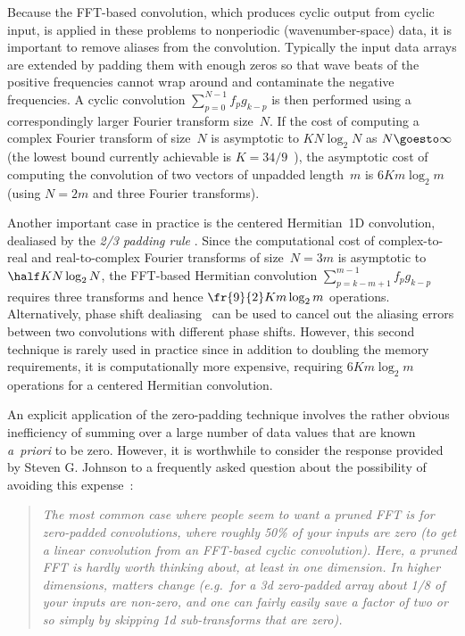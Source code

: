 \documentclass[final]{siamltex}
\begin{document}
Because the FFT-based convolution, which produces cyclic output from cyclic
input, is applied in these problems to nonperiodic (wavenumber-space) data,
it is important
to remove aliases from the convolution. Typically the input data arrays are
extended by padding them with enough zeros so that wave beats of
the positive frequencies cannot wrap around and contaminate
the negative frequencies. A cyclic convolution $\sum_{p=0}^{N-1} f_p g_{k-p}$ 
is then performed using a
correspondingly larger Fourier transform size~$N$. If the cost of 
computing a complex Fourier transform of size~$N$ is asymptotic to 
$K N\log_2 N$ as \hbox{$N\goesto\infty$} (the lowest bound currently 
achievable is $K=34/9$~\cite{Johnson07,Lundy07}), the asymptotic cost of
computing the convolution of two vectors of unpadded length~$m$ is
$6Km\log_2 m$ (using $N=2m$ and three Fourier transforms).

Another important case in practice is the centered Hermitian~1D
convolution, dealiased by the {\it 2/3 padding rule} \cite{Orszag71}.
Since the computational cost of complex-to-real and real-to-complex Fourier
transforms of size~$N=3m$ is asymptotic to $\half K N\log_2 N$, the
FFT-based Hermitian con\-vol\-u\-tion $\sum_{p=k-m+1}^{m-1} f_p g_{k-p}$
requires three transforms and hence $\fr{9}{2}Km\log_2 m$ operations.
Alternatively, phase shift dealiasing~\cite{Patterson71,Canuto06} can be used
to cancel out the aliasing errors between two convolutions with
different phase shifts. However, this second technique is rarely used in
practice since in addition to doubling the memory requirements, it is
computationally more expensive, requiring $6K m\log_2 m$ operations for a 
centered Hermitian convolution.

An explicit application of the zero-padding technique involves the rather
obvious inefficiency of summing over a large number of data values that
are known {\it a~priori\/} to be zero.
However, it is worthwhile to consider the response
provided by Steven G. Johnson to a frequently asked question about the
possibility of avoiding this expense~\cite{fftwprune}:
\begin{quotation}\label{Johnson}
{\it
The most common case where people seem to want a pruned FFT is for
zero-padded convolutions, where roughly 50\% of your inputs are zero (to
get a linear convolution from an FFT-based cyclic convolution). Here, a
pruned FFT is hardly worth thinking about, at least in one dimension. In
higher dimensions, matters change (e.g.\ for a 3d zero-padded array about
1/8 of your inputs are non-zero, and one can fairly easily save a factor of
two or so simply by skipping 1d sub-transforms that are zero).
}
\end{quotation}
\end{document}
